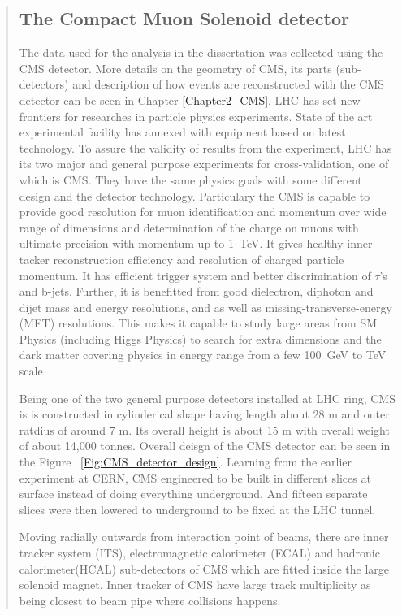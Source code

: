 \begin{abstract}
 \subsection{The Compact Muon Solenoid detector} \label{chinese_abstract_cms}
 The data used for the analysis in the dissertation was collected using the CMS detector.
  More details on the geometry of CMS, its parts (sub-detectors) and description of how events are reconstructed with the CMS detector can be seen in Chapter \ref{Chapter2_CMS}.  LHC has set new frontiers for researches in particle physics experiments. State of the art experimental facility has annexed with equipment based on latest technology. To assure the validity of results from the experiment, LHC has its two major and general purpose experiments for cross-validation, one of which is CMS. They have the same physics goals with some different design and the detector technology. Particulary the CMS is capable to provide good resolution for muon identification and momentum over wide range of dimensions and determination of the charge on muons with ultimate precision with momentum up to 1~TeV.
It gives healthy inner tacker reconstruction efficiency and resolution of charged particle momentum. It has efficient trigger system and better discrimination of  $\tau$'s and b-jets. Further, it is benefitted from good dielectron, diphoton and dijet mass and energy resolutions, and as well as missing-transverse-energy (MET) resolutions. 
This makes it capable to study large areas from SM Physics (including Higgs Physics) to search for extra dimensions and the dark matter covering physics in energy range from a few 100~GeV to TeV scale~\cite{Reference34}.
\par Being one of the two general purpose detectors installed at LHC ring, CMS is is constructed in cylinderical shape having length about 28 m and outer ratdius of around 7 m. Its overall height is about 15 m with overall weight of about 14,000 tonnes. Overall deisgn of the CMS detector can be seen in the Figure ~\ref{Fig:CMS_detector_design}. 
Learning from the earlier experiment at CERN, CMS engineered to be built in different slices at surface instead of doing everything underground.  And fifteen separate slices were then lowered to underground to be fixed at the LHC tunnel.\par
Moving radially outwards from interaction point of beams, there are inner tracker system (ITS), electromagnetic calorimeter (ECAL) and hadronic calorimeter(HCAL) sub-detectors of CMS which are fitted inside the large solenoid magnet. Inner tracker of CMS have large track multiplicity as being closest to beam pipe where collisions happens.

\end{abstract}

